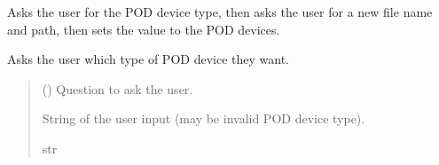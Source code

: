 \documentclass[letterpaper,10pt,english]{sphinxmanual}
\begin{document}
\begin{fulllineitems}
\begin{fulllineitems}
\end{fulllineitems}


\begin{fulllineitems}
\label{\detokenize{Setup_PodDevices:Setup_PodDevices.Setup_PodDevices._EditSaveFilePath}}
\pysigstartsignatures
{}
\pysigstopsignatures
\sphinxAtStartPar
Asks the user for the POD device type, then asks the user for a new file name and path,         then sets the value to the POD devices.

\end{fulllineitems}


\begin{fulllineitems}
\label{\detokenize{Setup_PodDevices:Setup_PodDevices.Setup_PodDevices._GetChosenDeviceType}}
\pysigstartsignatures
{}
\pysigstopsignatures
\sphinxAtStartPar
Asks the user which type of POD device they want.
\begin{quote}\begin{description}
\sphinxAtStartPar
{} () \textendash{} Question to ask the user.

\sphinxAtStartPar
String of the user input (may be invalid POD device type).

\sphinxAtStartPar
str

\end{description}\end{quote}

\end{fulllineitems}



\end{fulllineitems}
\end{document}

